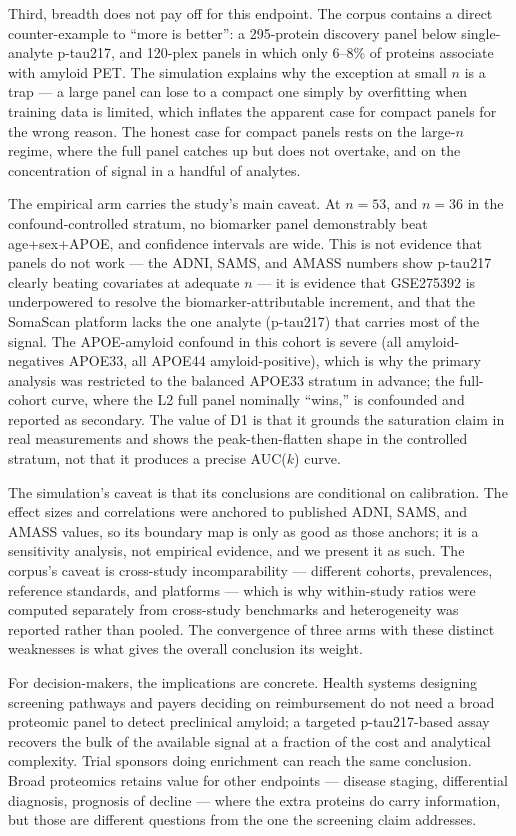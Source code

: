 \documentclass{article}
\begin{document}
Third, breadth does not pay off for this endpoint. The corpus contains a direct
counter-example to ``more is better'': a 295-protein discovery panel below
single-analyte p-tau217, and 120-plex panels in which only 6--8\% of proteins
associate with amyloid PET. The simulation explains why the exception at small
$n$ is a trap --- a large panel can lose to a compact one simply by overfitting
when training data is limited, which inflates the apparent case for compact
panels for the wrong reason. The honest case for compact panels rests on the
large-$n$ regime, where the full panel catches up but does not overtake, and on
the concentration of signal in a handful of analytes.

The empirical arm carries the study's main caveat. At $n=53$, and $n=36$ in the
confound-controlled stratum, no biomarker panel demonstrably beat age+sex+APOE,
and confidence intervals are wide. This is not evidence that panels do not work
--- the ADNI, SAMS, and AMASS numbers show p-tau217 clearly beating covariates
at adequate $n$ --- it is evidence that GSE275392 is underpowered to resolve the
biomarker-attributable increment, and that the SomaScan platform lacks the one
analyte (p-tau217) that carries most of the signal. The APOE-amyloid confound in
this cohort is severe (all amyloid-negatives APOE33, all APOE44
amyloid-positive), which is why the primary analysis was restricted to the
balanced APOE33 stratum in advance; the full-cohort curve, where the L2 full
panel nominally ``wins,'' is confounded and reported as secondary. The value of
D1 is that it grounds the saturation claim in real measurements and shows the
peak-then-flatten shape in the controlled stratum, not that it produces a
precise AUC($k$) curve.

The simulation's caveat is that its conclusions are conditional on calibration.
The effect sizes and correlations were anchored to published ADNI, SAMS, and
AMASS values, so its boundary map is only as good as those anchors; it is a
sensitivity analysis, not empirical evidence, and we present it as such. The
corpus's caveat is cross-study incomparability --- different cohorts,
prevalences, reference standards, and platforms --- which is why within-study
ratios were computed separately from cross-study benchmarks and heterogeneity
was reported rather than pooled. The convergence of three arms with these
distinct weaknesses is what gives the overall conclusion its weight.

For decision-makers, the implications are concrete. Health systems designing
screening pathways and payers deciding on reimbursement do not need a broad
proteomic panel to detect preclinical amyloid; a targeted p-tau217-based assay
recovers the bulk of the available signal at a fraction of the cost and
analytical complexity. Trial sponsors doing enrichment can reach the same
conclusion. Broad proteomics retains value for other endpoints --- disease
staging, differential diagnosis, prognosis of decline --- where the extra
proteins do carry information, but those are different questions from the one
the screening claim addresses.
\end{document}
